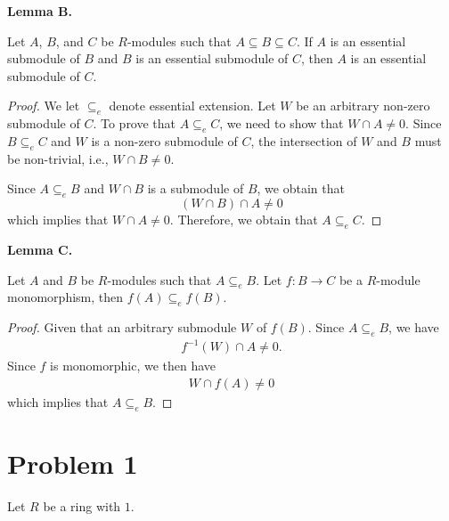 \documentclass[12pt, a4paper]{article}
\theoremstyle{remark}
\newenvironment{lemma}[1]{
    \noindent \textbf{Lemma #1.} \itshape
}{
    \vspace{1em}
}
\begin{document}
\begin{lemma}{B}
    Let $A$, $B$, and $C$ be $R$-modules such that $A \subseteq B \subseteq C$.
    If $A$ is an essential submodule of $B$ and $B$ is an essential submodule of $C$, then $A$ is an essential submodule of $C$.
\end{lemma}
\begin{proof}
    We let $\subseteq_e$ denote essential extension.
    Let $W$ be an arbitrary non-zero submodule of $C$. To prove that $A \subseteq_e C$, we need to show that $W \cap A \neq 0$.
    Since $B \subseteq_e C$ and $W$ is a non-zero submodule of $C$, the intersection of $W$ and $B$ must be non-trivial, i.e., $W \cap B \neq 0$. 

    Since $A\subseteq_e B$ and $W \cap B$ is a submodule of $B$, we obtain that 
    \[ (W \cap B) \cap A \neq 0 \]
    which implies that $W\cap A \neq 0$. Therefore, we obtain that $A\subseteq_e C$.
\end{proof}

\begin{lemma}{C}
    Let $A$ and $B$ be $R$-modules such that $A \subseteq_e B$. Let $f:B\to C$ be a $R$-module monomorphism, then $f(A)\subseteq_e f(B)$.
\end{lemma}
\begin{proof}
    Given that an arbitrary submodule $W$ of $f(B)$. Since $A\subseteq_e B$, we have
    \begin{align*}
        f^{-1}(W)\cap A \neq 0.
    \end{align*}
    Since $f$ is monomorphic, we then have 
        \begin{align*}
        W\cap f(A) \neq 0
    \end{align*}
    which implies that $A\subseteq_e B$.
\end{proof}

\section*{Problem 1}

Let $R$ be a ring with $1$.
\end{document}
